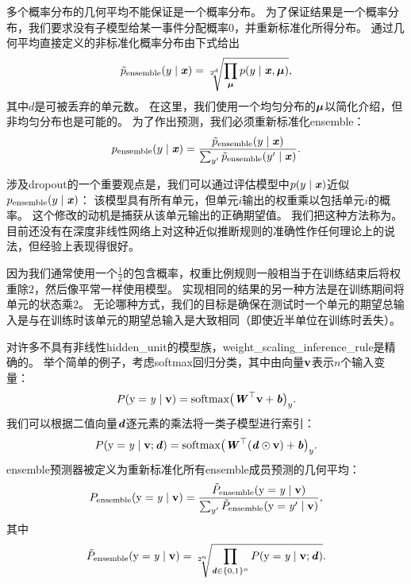 多个概率分布的几何平均不能保证是一个概率分布。
为了保证结果是一个概率分布，我们要求没有子模型给某一事件分配概率0，并重新标准化所得分布。
通过几何平均直接定义的非标准化概率分布由下式给出
\begin{align}
\tilde{p}_{\text{ensemble}}(y \mid \boldsymbol{\mathit{x}}) = \sqrt[2^d]{\prod_{\boldsymbol{\mu}} p(y \mid \boldsymbol{\mathit{x}}, \boldsymbol{\mu})},
\end{align}
其中$d$是可被丢弃的单元数。
在这里，我们使用一个均匀分布的$\boldsymbol{\mu}$以简化介绍，但非均匀分布也是可能的。
为了作出预测，我们必须重新标准化\gls{ensemble}：
\begin{align}
p_{\text{ensemble}}(y \mid \boldsymbol{\mathit{x}})  = \frac{\tilde{p}_{\text{ensemble}}(y \mid \boldsymbol{\mathit{x}})}
 {\sum_{y'}\tilde{p}_{\text{ensemble}}(y' \mid \boldsymbol{\mathit{x}}) }.
\end{align}
 
涉及\gls{dropout}的一个重要观点\citep{Hinton-et-al-arxiv2012}是，我们可以通过评估模型中$p(y \mid \boldsymbol{\mathit{x}})$近似$ p_{\text{ensemble}}(y \mid \boldsymbol{\mathit{x}}) $：
该模型具有所有单元，但单元$i$输出的权重乘以包括单元$i$的概率。
这个修改的动机是捕获从该单元输出的正确期望值。
我们把这种方法称为。
目前还没有在深度非线性网络上对这种近似推断规则的准确性作任何理论上的说法，但经验上表现得很好。

 
因为我们通常使用一个$\frac{1}{2}$的包含概率，权重比例规则一般相当于在训练结束后将权重除$2$，然后像平常一样使用模型。
实现相同的结果的另一种方法是在训练期间将单元的状态乘$2$。
无论哪种方式，我们的目标是确保在测试时一个单元的期望总输入是与在训练时该单元的期望总输入是大致相同（即使近半单位在训练时丢失）。

对许多不具有非线性\gls{hidden_unit}的模型族，\gls{weight_scaling_inference_rule}是精确的。
举个简单的例子，考虑\gls{softmax}回归分类，其中由向量$\mathbf{v}$表示$n$个输入变量：
\begin{align}
 P(\mathrm{y} = \mathit{y} \mid \mathbf{v}) = \text{softmax}\big(\boldsymbol{\mathit{W}}^\top\mathbf{v} + \boldsymbol{\mathit{b}}\big)_y.
\end{align}
我们可以根据二值向量$\boldsymbol{\mathit{d}}$逐元素的乘法将一类子模型进行索引：
\begin{align}
P(\mathrm{y} = \mathit{y} \mid \mathbf{v}; \boldsymbol{\mathit{d}}) = \text{softmax}\big(\boldsymbol{\mathit{W}}^\top(\boldsymbol{\mathit{d}} \odot \mathbf{v}) + \boldsymbol{\mathit{b}} \big)_y.
\end{align}
\gls{ensemble}预测器被定义为重新标准化所有\gls{ensemble}成员预测的几何平均：
\begin{align} \label{eq:758pe}
P_{\text{ensemble}}(\mathrm{y} = \mathit{y} \mid \mathbf{v})  = \frac{\tilde{P}_{\text{ensemble}}(\mathrm{y} = \mathit{y} \mid \mathbf{v})}
 {\sum_{y'}\tilde{P}_{\text{ensemble}}(\mathrm{y} = \mathit{y}' \mid \mathbf{v}) },
\end{align}
其中
\begin{align}
\tilde{P}_{\text{ensemble}}(\mathrm{y}=\mathit{y} \mid \mathbf{v}) =
\sqrt[2^n]{\prod_{\boldsymbol{\mathit{d}} \in \{0,1\}^n} P(\mathrm{y} = \mathit{y} \mid \mathbf{v}; \boldsymbol{\mathit{d}})}.
\end{align}

